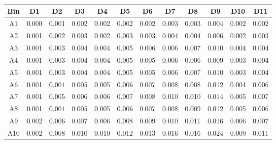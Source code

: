 \begin{tabular}{c@{~~~}c@{~~}c@{~~}c@{~~}c@{~~}c@{~~}c@{~~}c@{~~}c@{~~}c@{~~}c@{~~}c}
\hline 
 \hline 
Bin	& D1 & D2 & D3 & D4 & D5 & D6 & D7 & D8 & D9 & D10 & D11 \\ 
\hline 
A1	&  0.000 &  0.001 &  0.002 &  0.002 &  0.002 &  0.002 &  0.003 &  0.003 &  0.004 &  0.002 &  0.002 \\  
A2	&  0.001 &  0.002 &  0.003 &  0.002 &  0.003 &  0.003 &  0.004 &  0.004 &  0.006 &  0.002 &  0.003 \\  
A3	&  0.001 &  0.003 &  0.004 &  0.004 &  0.005 &  0.006 &  0.006 &  0.007 &  0.010 &  0.004 &  0.004 \\  
A4	&  0.001 &  0.003 &  0.004 &  0.004 &  0.005 &  0.005 &  0.006 &  0.006 &  0.009 &  0.003 &  0.004 \\  
A5	&  0.001 &  0.003 &  0.004 &  0.004 &  0.005 &  0.005 &  0.006 &  0.007 &  0.010 &  0.003 &  0.004 \\  
A6	&  0.001 &  0.004 &  0.005 &  0.005 &  0.006 &  0.007 &  0.008 &  0.008 &  0.012 &  0.004 &  0.006 \\  
A7	&  0.001 &  0.005 &  0.006 &  0.006 &  0.007 &  0.008 &  0.010 &  0.010 &  0.014 &  0.005 &  0.007 \\  
A8	&  0.001 &  0.004 &  0.005 &  0.005 &  0.006 &  0.007 &  0.008 &  0.009 &  0.012 &  0.005 &  0.006 \\  
A9	&  0.002 &  0.006 &  0.007 &  0.006 &  0.008 &  0.009 &  0.010 &  0.011 &  0.016 &  0.006 &  0.007 \\  
A10	&  0.002 &  0.008 &  0.010 &  0.010 &  0.012 &  0.013 &  0.016 &  0.016 &  0.024 &  0.009 &  0.011 \\  
\hline 
 \hline 
\end{tabular}